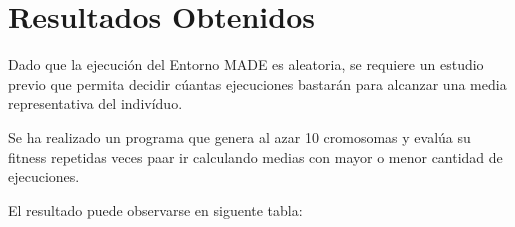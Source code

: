 


\chapter{Resultados Obtenidos}

Dado que la ejecución del Entorno MADE es aleatoria, se requiere un estudio previo que permita decidir cúantas ejecuciones bastarán para alcanzar una media representativa del indivíduo.

Se ha realizado un programa que genera al azar 10 cromosomas y evalúa su fitness repetidas veces paar ir calculando medias con mayor o menor cantidad de ejecuciones. 

El resultado puede observarse en siguente tabla:
 
